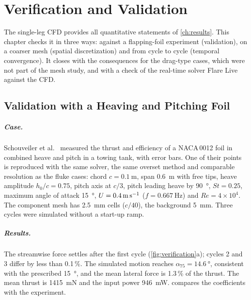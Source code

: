 \chapter{Verification and Validation}
\label{ch:verification}

The single-leg CFD provides all quantitative statements of \cref{ch:results}. This chapter checks it in three
ways: against a flapping-foil experiment (validation), on a coarser mesh (spatial discretization) and from cycle
to cycle (temporal convergence). It closes with the consequences for the drag-type cases, which were not part of
the mesh study, and with a check of the real-time solver Flare Live against the CFD.

\section{Validation with a Heaving and Pitching Foil}
\label{sec:ver-v1}

\paragraph{Case.} Schouveiler et al.\ \cite{Schouveiler2005} measured the thrust and efficiency of a NACA\,0012
foil in combined heave and pitch in a towing tank, with error bars. One of their points is reproduced with the
same solver, the same overset method and comparable resolution as the fluke cases: chord $c=\SI{0.1}{\metre}$,
span \SI{0.6}{\metre} with free tips, heave amplitude $h_0/c=0.75$, pitch axis at $c/3$, pitch leading heave by
\SI{90}{\degree}, $\mathit{St}=0.25$, maximum angle of attack \SI{15}{\degree}, $U=\SI{0.4}{\metre\per\second}$
($f=\SI{0.667}{\hertz}$) and $\mathit{Re}=4\times10^4$. The component mesh has \SI{2.5}{\milli\metre} cells
($c/40$), the background \SI{5}{\milli\metre}. Three cycles were simulated without a start-up ramp.

\paragraph{Results.} The streamwise force settles after the first cycle (\cref{fig:verification}a); cycles 2 and 3
differ by less than 0.1\,\%. The simulated motion reaches $\alpha_{75}=\SI{14.6}{\degree}$, consistent with the
prescribed \SI{15}{\degree}, and the mean lateral force is 1.3\,\% of the thrust. The mean thrust is
\SI{1415}{\milli\newton} and the input power \SI{946}{\milli\watt}.  compares the coefficients
with the experiment.

